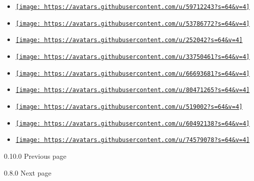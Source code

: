 \begin{itemize}
\item
  \href{https://github.com/antonWetzel}{\texttt{[image: https://avatars.githubusercontent.com/u/59712243?s=64\&v=4]}}
\item
  \href{https://github.com/arnaudgolfouse}{\texttt{[image: https://avatars.githubusercontent.com/u/53786772?s=64\&v=4]}}
\item
  \href{https://github.com/drupol}{\texttt{[image: https://avatars.githubusercontent.com/u/252042?s=64\&v=4]}}
\item
  \href{https://github.com/dxniel-19}{\texttt{[image: https://avatars.githubusercontent.com/u/33750461?s=64\&v=4]}}
\item
  \href{https://github.com/extua}{\texttt{[image: https://avatars.githubusercontent.com/u/66693681?s=64\&v=4]}}
\item
  \href{https://github.com/fritzrehde}{\texttt{[image: https://avatars.githubusercontent.com/u/80471265?s=64\&v=4]}}
\item
  \href{https://github.com/johannes-wolf}{\texttt{[image: https://avatars.githubusercontent.com/u/519002?s=64\&v=4]}}
\item
  \href{https://github.com/qrnch-jan}{\texttt{[image: https://avatars.githubusercontent.com/u/60492138?s=64\&v=4]}}
\item
  \href{https://github.com/toddlerer}{\texttt{[image: https://avatars.githubusercontent.com/u/74579078?s=64\&v=4]}}
\end{itemize}

\href{/docs/changelog/0.10.0/}{\pandocbounded{}}

{ 0.10.0 } { Previous page }

\href{/docs/changelog/0.8.0/}{\pandocbounded{}}

{ 0.8.0 } { Next page }
